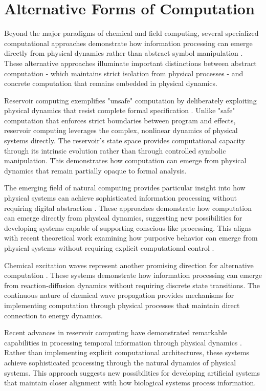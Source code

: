 \section{Alternative Forms of Computation}

Beyond the major paradigms of chemical and field computing, several specialized computational approaches demonstrate how information processing can emerge directly from physical dynamics rather than abstract symbol manipulation \cite{Adamatzky2021}. These alternative approaches illuminate important distinctions between abstract computation - which maintains strict isolation from physical processes - and concrete computation that remains embedded in physical dynamics.

Reservoir computing exemplifies "unsafe" computation by deliberately exploiting physical dynamics that resist complete formal specification \cite{Braund2020}. Unlike "safe" computation that enforces strict boundaries between program and effects, reservoir computing leverages the complex, nonlinear dynamics of physical systems directly. The reservoir's state space provides computational capacity through its intrinsic evolution rather than through controlled symbolic manipulation. This demonstrates how computation can emerge from physical dynamics that remain partially opaque to formal analysis.

The emerging field of natural computing provides particular insight into how physical systems can achieve sophisticated information processing without requiring digital abstraction \cite{Calude2018a}. These approaches demonstrate how computation can emerge directly from physical dynamics, suggesting new possibilities for developing systems capable of supporting conscious-like processing. This aligns with recent theoretical work examining how purposive behavior can emerge from physical systems without requiring explicit computational control \cite{Deacon2019}.

Chemical excitation waves represent another promising direction for alternative computation \cite{Gorecki2020}. These systems demonstrate how information processing can emerge from reaction-diffusion dynamics without requiring discrete state transitions. The continuous nature of chemical wave propagation provides mechanisms for implementing computation through physical processes that maintain direct connection to energy dynamics.

Recent advances in reservoir computing have demonstrated remarkable capabilities in processing temporal information through physical dynamics \cite{Jaeger2021}. Rather than implementing explicit computational architectures, these systems achieve sophisticated processing through the natural dynamics of physical systems. This approach suggests new possibilities for developing artificial systems that maintain closer alignment with how biological systems process information.

